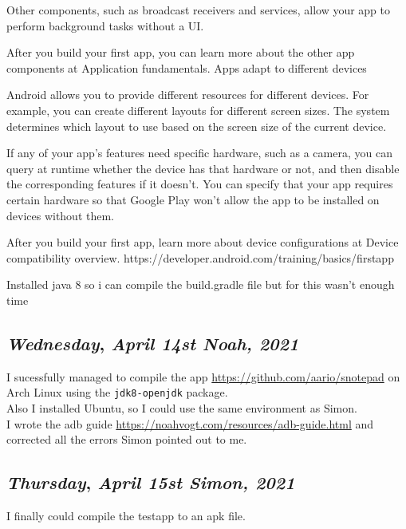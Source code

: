 Other components, such as broadcast receivers and services, allow your app to perform background tasks without a UI.

After you build your first app, you can learn more about the other app components at Application fundamentals.
Apps adapt to different devices

Android allows you to provide different resources for different devices. For example, you can create different layouts for different screen sizes. The system determines which layout to use based on the screen size of the current device.

If any of your app's features need specific hardware, such as a camera, you can query at runtime whether the device has that hardware or not, and then disable the corresponding features if it doesn't. You can specify that your app requires certain hardware so that Google Play won't allow the app to be installed on devices without them.

After you build your first app, learn more about device configurations at Device compatibility overview. 
https://developer.android.com/training/basics/firstapp

Installed java 8 so i can compile the build.gradle file but for this wasn't enough time

\def\day{\textit{April 14st Noah, 2021}}
\def\weekday{\textit{Wednesday}}
\subsection*{\weekday, \day}

I sucessfully managed to compile the app \url{https://github.com/aario/snotepad} on Arch Linux using the \texttt{jdk8-openjdk} package.\\

Also I installed Ubuntu, so I could use the same environment as Simon.\\

I wrote the adb guide \url{https://noahvogt.com/resources/adb-guide.html} and corrected all the errors Simon pointed out to me.

\def\day{\textit{April 15st Simon, 2021}}
\def\weekday{\textit{Thursday}}
\subsection*{\weekday, \day}

I finally could compile the testapp to an apk file. 


\newpage
\def\day{\textit{April 19st Noah, 2021}}
\def\weekday{\textit{Monday}}

